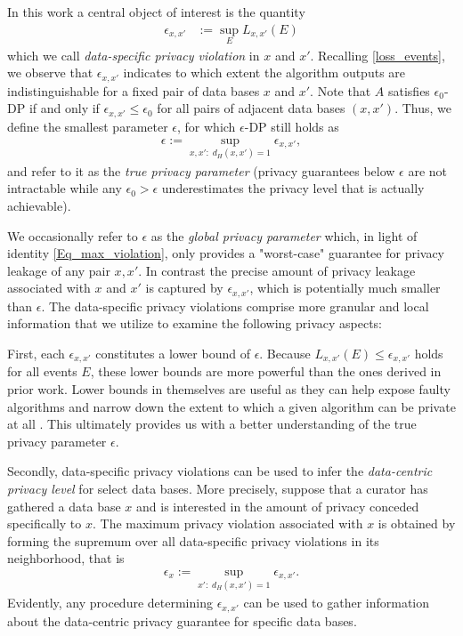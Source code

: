 \documentclass[conference]{IEEEtran}
\begin{document}
In this work a central object of interest is the quantity
\begin{align} 
\epsilon_{x,x'} & := \sup_E L_{x,x'}(E)
\label{lower_bound}
\end{align}
which we call \textit{data-specific privacy violation} in $x$ and $x'$. Recalling \eqref{loss_events}, we observe that $\epsilon_{x,x'}$ indicates to which extent  the algorithm outputs are indistinguishable  for a fixed pair of data bases $x$ and $x'$. Note that $A$ satisfies $\epsilon_0$-DP if and only if $\epsilon_{x,x'} \le \epsilon_0$ for all pairs of adjacent data bases $(x,x')$. Thus, we define the smallest parameter $\epsilon$, for which $\epsilon$-DP still holds as
\begin{align} \label{Eq_max_violation}
\epsilon := \sup\limits_{x,x': \; d_H(x,x') = 1} \epsilon_{x,x'},
\end{align}
and refer to it as the \textit{true privacy parameter} (privacy guarantees below $\epsilon$ are not intractable while any $\epsilon_0 > \epsilon$ underestimates the privacy level that is actually achievable). 

We occasionally refer to $\epsilon$ as the \textit{global privacy parameter} which, in light of  identity  \eqref{Eq_max_violation}, only provides a "worst-case" guarantee for privacy leakage of any pair $x,x'$. In contrast the precise amount of privacy leakage associated with $x$ and $x'$ is captured by $\epsilon_{x,x'}$, which is potentially much smaller than $\epsilon$. The data-specific privacy violations comprise more granular and local information that we utilize to examine the following privacy aspects:


First, each $\epsilon_{x,x'}$ constitutes a lower bound of $\epsilon$. Because $L_{x,x'}(E) \leq \epsilon_{x,x'}$ holds for all events $E$, these lower bounds are more powerful than the ones derived in prior work. Lower bounds in themselves are useful as they can help expose faulty algorithms \cite{DP-Finder} and narrow down the extent to which a given algorithm can be private at all \cite{DP-Sniper}. This ultimately provides us with a better understanding of the true privacy parameter $\epsilon$.


Secondly, data-specific privacy violations can be used to infer the \textit{data-centric privacy level} for select data bases. More precisely, suppose that a curator has gathered a data base $x$ and is interested in the amount of privacy conceded specifically to $x$. The maximum privacy violation associated with $x$ is obtained by forming the supremum over all data-specific privacy violations in its neighborhood, that is
\begin{align}
    \label{Eq_def_epsx}
\epsilon_x := \sup\limits_{x': \; d_H(x,x') = 1} \epsilon_{x,x'}.
\end{align}
Evidently, any procedure determining $\epsilon_{x,x'}$ can be used to gather information about the data-centric privacy guarantee for specific data bases.
\end{document}
